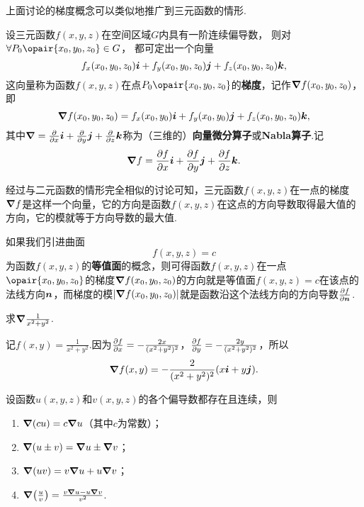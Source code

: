 上面讨论的梯度概念可以类似地推广到三元函数的情形.
\begin{definition}
设三元函数\(f(x,y,z)\)在空间区域\(G\)内具有一阶连续偏导数，%
则对\(\forall P_0\opair{x_0,y_0,z_0} \in G\)，%
都可定出一个向量\[
f_x(x_0,y_0,z_0) \boldsymbol{i} + f_y(x_0,y_0,z_0) \boldsymbol{j} + f_z(x_0,y_0,z_0) \boldsymbol{k},
\]这向量称为函数\(f(x,y,z)\)在点\(P_0\opair{x_0,y_0,z_0}\)的\textbf{梯度}，记作\(\grad{f}(x_0,y_0,z_0)\)，即\[
\grad{f}(x_0,y_0,z_0)
= f_x(x_0,y_0) \boldsymbol{i} + f_y(x_0,y_0) \boldsymbol{j} + f_z(x_0,y_0,z_0) \boldsymbol{k},
\]其中\(\grad = \pdv{x} \boldsymbol{i} + \pdv{y} \boldsymbol{j} + \pdv{z} \boldsymbol{k}\)称为（三维的）\textbf{向量微分算子}或\textbf{Nabla算子}.记\[
\grad{f} = \pdv{f}{x} \boldsymbol{i} + \pdv{f}{y} \boldsymbol{j} + \pdv{f}{z} \boldsymbol{k}.
\]
\end{definition}

经过与二元函数的情形完全相似的讨论可知，三元函数\(f(x,y,z)\)在一点的梯度\(\grad{f}\)是这样一个向量，它的方向是函数\(f(x,y,z)\)在这点的方向导数取得最大值的方向，它的模就等于方向导数的最大值.

如果我们引进曲面\[
f(x,y,z) = c
\]为函数\(f(x,y,z)\)的\textbf{等值面}的概念，则可得函数\(f(x,y,z)\)在一点\(\opair{x_0,y_0,z_0}\)的梯度\(\grad f(x_0,y_0,z_0)\)的方向就是等值面\(f(x,y,z) = c\)在该点的法线方向\(\boldsymbol{n}\)，而梯度的模\(\abs{\grad f(x_0,y_0,z_0)}\)就是函数沿这个法线方向的方向导数\(\pdv{f}{\boldsymbol{n}}\).

\begin{example}
求\(\grad \frac{1}{x^2+y^2}\).
\begin{solution}
记\(f(x,y) = \frac{1}{x^2+y^2}\).因为\(\pdv{f}{x} = -\frac{2x}{(x^2+y^2)^2}\)，\(\pdv{f}{y} = -\frac{2y}{(x^2+y^2)^2}\)，所以\[
\grad f(x,y) = -\frac{2}{(x^2+y^2)^2} (x \boldsymbol{i} + y \boldsymbol{j}).
\]
\end{solution}
\end{example}

\begin{theorem}\label{theorem:多元函数微分法.梯度的运算法则}
设函数\(u(x,y,z)\)和\(v(x,y,z)\)的各个偏导数都存在且连续，则\begin{enumerate}
\item \(\grad(c u) = c \grad u\)（其中\(c\)为常数）；
\item \(\grad(u \pm v) = \grad u \pm \grad v\)；
\item \(\grad(uv) = v \grad u + u \grad v\)；
\item \(\grad(\frac{u}{v}) = \frac{v \grad u - u \grad v}{v^2}\).
\end{enumerate}
\end{theorem}

